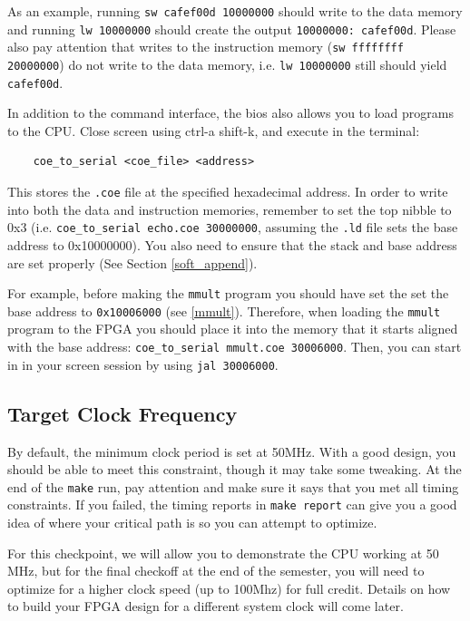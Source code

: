 \documentclass[11pt]{article}
\begin{document}
As an example, running \verb|sw cafef00d 10000000| should write to the data memory and running \verb|lw 10000000| should create the output \verb|10000000: cafef00d|. Please also pay attention that writes to the instruction memory (\verb|sw ffffffff 20000000|) do not write to the data memory, i.e. \verb|lw 10000000| still should yield \verb|cafef00d|.

In addition to the command interface, the bios also allows you to load programs to the CPU. Close screen using ctrl-a shift-k, and execute in the terminal:
\begin{verbatim}
    coe_to_serial <coe_file> <address>
\end{verbatim}

This stores the \verb|.coe| file at the specified hexadecimal address. In order to write into both the data and instruction memories, remember to set the top nibble to 0x3 (i.e. \verb|coe_to_serial echo.coe 30000000|, assuming the \verb|.ld| file sets the base address to 0x10000000). You also need to ensure that the stack and base address are set properly (See Section \ref{soft_append}).

For example, before making the \verb|mmult| program you should have set the set the base address to \verb|0x10006000| (see \ref{mmult}). Therefore, when loading the \verb|mmult| program to the FPGA you should place it into the memory that it starts aligned with the base address: \verb|coe_to_serial mmult.coe 30006000|. Then, you can start in in your screen session by using \verb|jal 30006000|.

\subsection{Target Clock Frequency}
By default, the minimum clock period is set at 50MHz. With a good design, you should be able to meet this constraint, though it may take some tweaking. At the end of the \verb|make| run, pay attention and make sure it says that you met all timing constraints. If you failed, the timing reports in \verb|make report| can give you a good idea of where your critical path is so you can attempt to optimize.

For this checkpoint, we will allow you to demonstrate the CPU working at 50 MHz, but for the final checkoff at the end of the semester, you will need to optimize for a higher clock speed (up to 100Mhz) for full credit. Details on how to build your FPGA design for a different system clock will come later.
\end{document}
